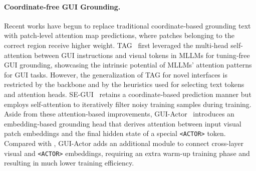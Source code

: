 \paragraph{Coordinate-free GUI Grounding.} Recent works have begun to replace traditional coordinate‑based grounding text with patch‑level attention map predictions, where patches belonging to the correct region receive higher weight. TAG~\citep{xu2024attentiondrivenguigroundingleveraging} first leveraged the multi-head self-attention between GUI instructions and visual tokens in MLLMs for tuning‑free GUI grounding, showcasing the intrinsic potential of MLLMs' attention patterns for GUI tasks. However, the generalization of TAG for novel interfaces is restricted by the backbone and by the heuristics used for selecting text tokens and attention heads. SE-GUI~\citep{yuan2025enhancing} retains a coordinate‑based prediction manner but employs self‑attention to iteratively filter noisy training samples during training. Aside from these attention-based improvements, GUI-Actor~\citep{wu2025gui} introduces an embedding‑based grounding head that derives attention between input visual patch embeddings and the final hidden state of a special \texttt{<ACTOR>} token. Compared with \method{}, GUI-Actor adds an additional module to connect cross-layer visual and \texttt{<ACTOR>} embeddings, requiring an extra warm-up training phase and resulting in much lower training efficiency.